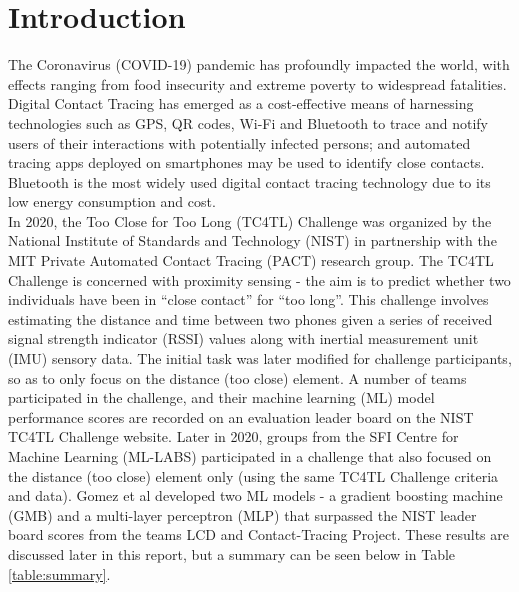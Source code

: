 \documentclass[conference]{IEEEtran}
\begin{document}
\section{Introduction}
The Coronavirus (COVID-19) pandemic has  profoundly impacted the world, with effects ranging from food insecurity and extreme poverty to widespread fatalities. Digital Contact Tracing has emerged as a cost-effective means of harnessing  technologies such as GPS, QR codes, Wi-Fi and Bluetooth to trace and notify users of their interactions with potentially infected persons; and automated tracing apps deployed on smartphones may be used to identify close contacts. Bluetooth is the most widely used digital contact tracing technology due to its low energy consumption and cost.  \cite{b1} \\
\indent In 2020, the Too Close for Too Long (TC4TL) Challenge was organized by the National Institute of Standards and Technology (NIST) in partnership with the MIT Private Automated Contact Tracing (PACT) research group.  \cite{b2} 
The TC4TL Challenge is concerned with proximity sensing - the aim is to predict whether two individuals have been in \enquote{close contact} for \enquote{too long}. This challenge involves estimating the distance and time between two phones given a series of received signal strength indicator (RSSI) values along with  inertial measurement unit (IMU) sensory data.   The initial task was later modified for challenge participants, so as to only focus on the distance (too close)  element.
A number of teams participated in the challenge, and their machine learning (ML) model performance scores are recorded on an evaluation leader board on the NIST TC4TL Challenge website. \cite{b3} Later in 2020, groups from the SFI  Centre  for  Machine Learning (ML-LABS) participated in a challenge that also focused on the distance (too close)  element only (using the same TC4TL Challenge criteria and data). Gomez et al \cite{b4} developed two ML models - a gradient boosting machine (GMB) and a multi-layer perceptron (MLP) that surpassed the NIST leader board  scores from the teams LCD and Contact-Tracing Project. These results are discussed later in this report, but a summary can be seen below in Table \ref{table:summary}.  \\
\end{document}
